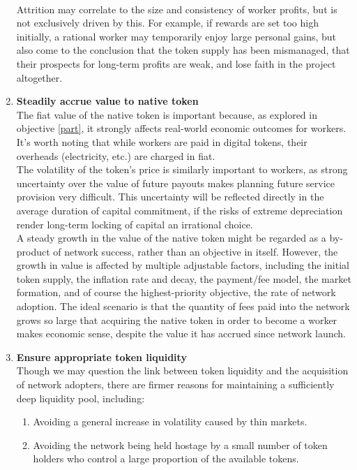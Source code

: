 \documentclass[11pt]{amsart}
\begin{document}
\begin{enumerate}
   \\
   Attrition may correlate to the size and consistency of worker profits, but is not exclusively driven by this. For example, if rewards are set too high initially, a rational worker may temporarily enjoy large personal gains, but also come to the conclusion that the token supply has been mismanaged, that their prospects for long-term profits are weak, and lose faith in the project altogether. 
   \\
   \item \textbf{Steadily accrue value to native token} \label{value}
   \\
   The fiat value of the native token is important because, as explored in objective \ref{part}, it strongly affects real-world economic outcomes for workers. It's worth noting that while workers are paid in digital tokens, their overheads (electricity, etc.) are charged in fiat. 
   \\
   The volatility of the token's price is similarly important to workers, as strong uncertainty over the value of future payouts makes planning future service provision very difficult. This uncertainty will be reflected directly in the average duration of capital commitment, if the risks of extreme depreciation render long-term locking of capital an irrational choice. 
   \\
   A steady growth in the value of the native token might be regarded as a by-product of network success, rather than an objective in itself. However, the growth in value is affected by multiple adjustable factors, including the initial token supply, the inflation rate and decay, the payment/fee model, the market formation, and of course the highest-priority objective, the rate of network adoption. The ideal scenario is that the quantity of fees paid into the network grows so large that acquiring the native token in order to become a worker makes economic sense, despite the value it has accrued since network launch.  
   \\
   \item \textbf{Ensure appropriate token liquidity}\label{liquid}
   \\
   Though we may question the link between token liquidity and the acquisition of network adopters, there are firmer reasons for maintaining a sufficiently deep liquidity pool, including:
   \begin{enumerate}
   \item Avoiding a general increase in volatility caused by thin markets.
   \item Avoiding the network being held hostage by a small number of token holders who control a large proportion of the available tokens. 

\end{enumerate}
\end{enumerate}
\end{document}
